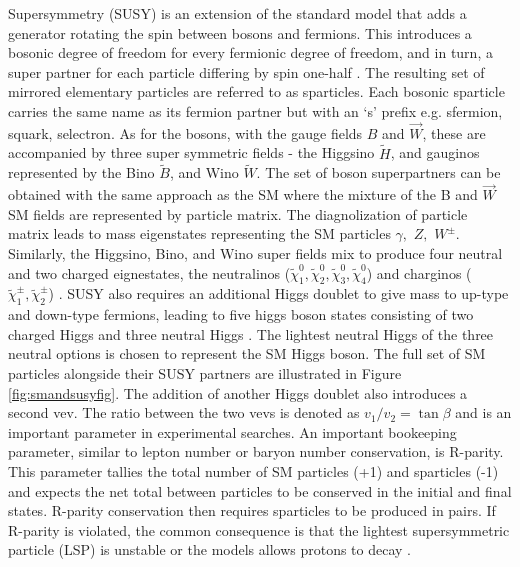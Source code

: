 Supersymmetry (SUSY) is an extension of the standard model that adds a generator rotating the spin between bosons and fermions. This introduces a bosonic degree of freedom for every fermionic degree of freedom, and in turn, a super partner for each particle differing by spin one-half \cite{Baer:2007izw}.  The resulting set of mirrored elementary particles are referred to as sparticles. Each bosonic sparticle carries the same name as its fermion partner but with an `s' prefix e.g. sfermion, squark, selectron. As for the bosons, with the gauge fields $B$ and $\vec{W}$, these are accompanied by three super symmetric fields - the Higgsino $\tilde{H}$, and gauginos represented by the Bino $\tilde{B}$, and Wino $\tilde{W}$. The set of boson superpartners can be obtained with the same approach as the SM where the mixture of the B and $\vec{W}$ SM fields are represented by particle matrix.  The diagnolization of particle matrix leads to mass eigenstates representing the SM particles $\gamma, \, \, Z, \, \, W^\pm$. Similarly, the Higgsino, Bino, and Wino super fields mix to produce four neutral and two charged eignestates, the neutralinos ($\tilde{\chi}^0_1, \tilde{\chi}^0_2, \tilde{\chi}^0_3, \tilde{\chi}^0_4$)  and charginos ($\tilde{\chi}^\pm_1, \tilde{\chi}^\pm_2$) \cite{DJOUADI_2008}. SUSY also requires an additional Higgs doublet to give mass to up-type and down-type fermions,  leading to five higgs boson states consisting of two charged Higgs and three neutral Higgs \cite{Adam:2021rrw}. The lightest neutral Higgs of the three neutral options is chosen to represent the SM Higgs boson. The full set of SM particles alongside their SUSY partners are illustrated in Figure \ref{fig:smandsusyfig}. The addition of another Higgs doublet also introduces a second vev. The ratio between the two vevs is denoted as $v_1/v_2 = \tan \beta$ and is an important parameter in experimental searches. An important bookeeping parameter, similar to lepton number or baryon number conservation, is R-parity. This parameter tallies the total number of SM particles (+1) and sparticles (-1) and expects the net total between particles to be conserved in the initial and final states. R-parity conservation then requires sparticles to be produced in pairs. If R-parity is violated, the common consequence is that the lightest supersymmetric particle (LSP) is unstable or the models allows protons to decay \cite{Farrar:1978xj}. 




